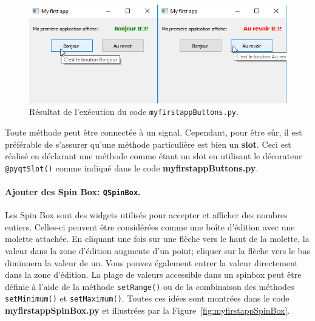 \documentclass[%
oneside,                 %
final,                   %
10pt,french]{article}
\begin{document}
\begin{figure}[!ht]  %
  \centerline{\includegraphics[width=0.4\linewidth]{imgs/myfirstappButtons.png}}
  \caption{
  Résultat de l'exécution du code \texttt{myfirstappButtons.py}. \label{fig:myfirstappButtons}
  }
\end{figure}


Toute méthode peut être connectée à un signal. Cependant, pour être sûr, il est préférable de s’assurer qu’une méthode particulière est bien un \textbf{slot}. Ceci est réalisé en déclarant une méthode comme étant un slot en utilisant le décorateur \texttt{@pyqtSlot()} comme indiqué dans le code \textbf{myfirstappButtons.py}.

\paragraph{Ajouter des Spin Box: \texttt{QSpinBox}.}
Les Spin Box sont des widgets utilisés pour accepter et afficher des nombres entiers. Celles-ci peuvent être considérées comme une boîte d'édition avec une molette attachée. En cliquant une fois sur une flèche vers le haut de la molette, la valeur dans la zone d'édition augmente d'un point; cliquer sur la flèche vers le bas diminuera la valeur de un. Vous pouvez également entrer la valeur directement dans la zone d'édition. La plage de valeurs accessible dans un spinbox peut être définie à l'aide de la méthode \texttt{setRange()} ou de la combinaison des méthodes \texttt{setMinimum()} et \texttt{setMaximum()}. Toutes ces idées sont montrées dans le code \textbf{myfirstappSpinBox.py} et illustrées par la Figure~\ref{fig:myfirstappSpinBox}.
\end{document}

